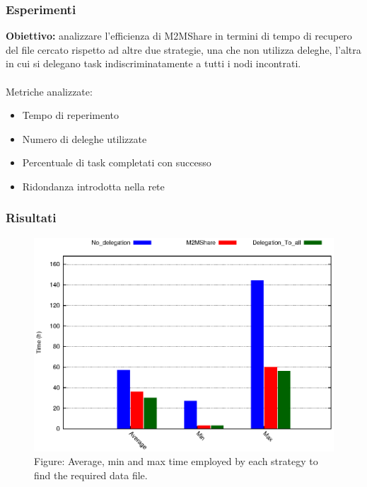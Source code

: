 \documentclass{beamer}
\begin{document}
\begin{frame}
\label{Esperimenti}
\frametitle{Esperimenti}
\textbf{Obiettivo:} analizzare l'efficienza di M2MShare in termini di tempo di recupero del file cercato rispetto ad altre due strategie, una che non utilizza deleghe, l'altra in cui si delegano task indiscriminatamente a tutti i nodi incontrati.\\
\ \\
Metriche analizzate:
\begin{itemize}
\item Tempo di reperimento
\item Numero di deleghe utilizzate
\item Percentuale di task completati con successo
\item Ridondanza introdotta nella rete
\end{itemize}
\end{frame}

\begin{frame}
\frametitle{Risultati}
\begin{center}
\begin{figure}[ht]
\includegraphics[scale=0.7]{tempi.eps}
\caption{Figure: Average, min and max time employed by each strategy to find the required data file.}
\end{figure}
\end{center}
\end{frame}
\end{document}
